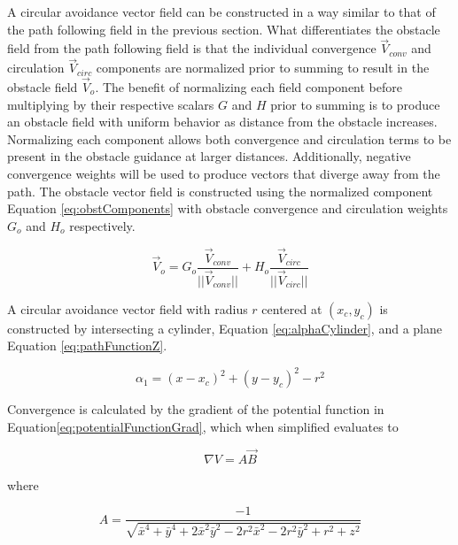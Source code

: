 \documentclass[numbered,pdftex]{ohio-etd}
\begin{document}
A circular avoidance vector field can be constructed in a way similar to that of the path following field in the previous section. What differentiates the obstacle field from the path following field is that the individual convergence $\overrightarrow{V}_{conv}$ and circulation $\overrightarrow{V}_{circ}$ components are normalized prior to summing to result in the obstacle field $\overrightarrow{V}_o$. The benefit of normalizing each field component before multiplying by their respective scalars $G$ and $H$ prior to summing is to produce an obstacle field with uniform behavior as distance from the obstacle increases. Normalizing each component allows both convergence and circulation terms to be present in the obstacle guidance at larger distances. Additionally, negative convergence weights will be used to produce vectors that diverge away from the path. The obstacle vector field is constructed using the normalized component Equation \ref{eq:obstComponents} with obstacle convergence and circulation weights $G_o$ and $H_o$ respectively.


\begin{equation}
\overrightarrow{V}_{o} = G_o\frac{\overrightarrow{V}_{conv}}{||\overrightarrow{V}_{conv}||}+H_o\frac{\overrightarrow{V}_{circ}}{||\overrightarrow{V}_{circ}||}
\label{eq:obstComponents}
\end{equation}



A circular avoidance vector field with radius $r$ centered at $(x_c,y_c)$ is constructed by intersecting a cylinder, Equation \ref{eq:alphaCylinder}, and a plane Equation \ref{eq:pathFunctionZ}. 

\begin{equation}\label{eq:alphaCylinder}
\alpha_1 = (x-x_c)^2 + (y-y_c)^2-r^2
\end{equation}


Convergence is calculated by the gradient of the potential function in Equation\ref{eq:potentialFunctionGrad}, which when simplified evaluates to

\begin{equation}
\nabla V = A\overrightarrow{B}
\label{eq:AB}
\end{equation}

\noindent
where


\begin{equation}
A = \dfrac{-1}{\sqrt{\bar{x}^4+\bar{y}^4+2\bar{x}^2\bar{y}^2-2r^2\bar{x}^2-2r^2\bar{y}^2+r^2+z^2}}
\end{equation}
\end{document}
